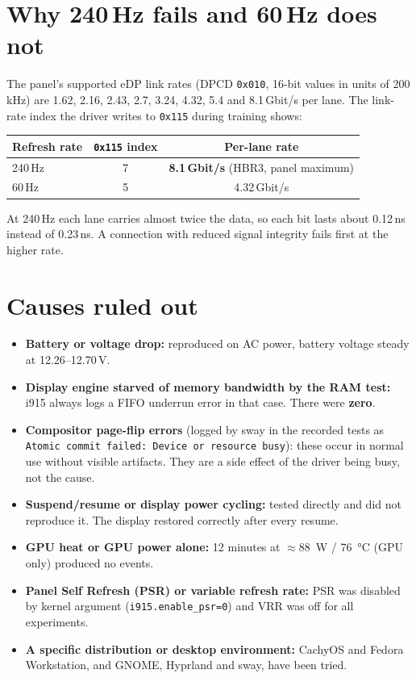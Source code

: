\documentclass[11pt,a4paper]{article}
\newcommand{\reg}[1]{\texttt{#1}}
\begin{document}
\section{Why 240\,Hz fails and 60\,Hz does not}
The panel's supported eDP link rates (DPCD \reg{0x010}, 16-bit values in units of 200\,kHz) are 1.62, 2.16, 2.43, 2.7, 3.24, 4.32,
5.4 and 8.1\,Gbit/s per lane. The link-rate index the driver writes to \reg{0x115} during training shows:

\begin{center}
\begin{tabular}{@{}l c c@{}}
\toprule
Refresh rate & \reg{0x115} index & Per-lane rate\\
\midrule
240\,Hz & 7 & \textbf{8.1\,Gbit/s} (HBR3, panel maximum)\\
60\,Hz & 5 & 4.32\,Gbit/s\\
\bottomrule
\end{tabular}
\end{center}

\noindent At 240\,Hz each lane carries almost twice the data, so each bit lasts about 0.12\,ns instead of 0.23\,ns. A connection
with reduced signal integrity fails first at the higher rate.

\section{Causes ruled out}
\begin{itemize}
\item \textbf{Battery or voltage drop:} reproduced on AC power, battery voltage steady at 12.26--12.70\,V.
\item \textbf{Display engine starved of memory bandwidth by the RAM test:} i915 always logs a FIFO underrun error in that case. There were \textbf{zero}.
\item \textbf{Compositor page-flip errors} (logged by sway in the recorded tests as \reg{Atomic commit failed: Device or resource busy}): these occur in normal use without visible
artifacts. They are a side effect of the driver being busy, not the cause.
\item \textbf{Suspend/resume or display power cycling:} tested directly and did not reproduce it. The display restored correctly after every resume.
\item \textbf{GPU heat or GPU power alone:} 12 minutes at $\approx$\SI{88}{W} / \SI{76}{\celsius} (GPU only) produced no events.
\item \textbf{Panel Self Refresh (PSR) or variable refresh rate:} PSR was disabled by kernel argument (\reg{i915.enable\_psr=0}) and
VRR was off for all experiments.
\item \textbf{A specific distribution or desktop environment:} CachyOS and Fedora Workstation, and GNOME, Hyprland and sway, have been tried.
\end{itemize}
\end{document}
